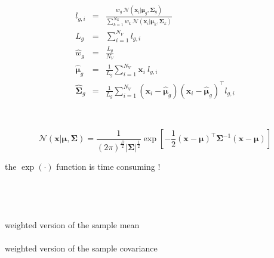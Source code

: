 \documentclass[usenames,dvipsnames]{beamer}
\def\Vec#1{{\boldsymbol{#1}}}
\def\Mat#1{{\boldsymbol{#1}}}
\begin{document}
\begin{frame}
\begin{enumerate}[{~~$\boldsymbol{\bullet}$}]
\begin{minipage}{1\textwidth}
\begin{minipage}{0.45\textwidth}
\centering
%
\begin{eqnarray*}
  l_{g,i}                  & = & \frac{w_g ~ {{\mathcal{N}}}( \Vec{x}_i | \Vec{\mu}_g, \Mat{\Sigma}_g )}{\sum\nolimits_{k=1}^{N_G} w_k ~ {{\mathcal{N}}}( \Vec{x}_i | \Vec{\mu}_k, \Mat{\Sigma}_k )} \\
  L_g                      & = & \sum\nolimits_{i=1}^{N_V} l_{g,i} \\
  \widehat{w}_g            & = & \frac{L_g}{N_V} \\
  \widehat{\Vec{\mu}}_g    & = & \frac{1}{L_g} \sum\nolimits_{i=1}^{N_V} \Vec{x}_i ~ l_{g,i}  \label{eqn:em_mean}  \\
  \widehat{\Mat{\Sigma}}_g & = & \frac{1}{L_g} \sum\nolimits_{i=1}^{N_V} (\Vec{x}_i - \widehat{\Vec{\mu}}_g)(\Vec{x}_i - \widehat{\Vec{\mu}}_g)^\top l_{g,i}
\end{eqnarray*}
\end{minipage}
~
\begin{minipage}{0.45\textwidth}
\begin{tiny}%
\begin{equation*}
  {{\mathcal{N}}}( \Vec{x} | \Vec{\mu}, \Mat{\Sigma} )  = 
  \frac{1}{ (2\pi)^{\frac{D}{2}} | \Mat{\Sigma}|^{\frac{1}{2}} }
  \exp \left[ -\frac{1}{2} (\Vec{x}-\Vec{\mu})^\top \Mat{\Sigma}^{-1} (\Vec{x}-\Vec{\mu}) \right]
\end{equation*}%
\end{tiny}%
the $\exp(\cdot)$ function is time consuming !\\
~\\
~\\
~\\
~\\
weighted version of the sample mean\\
~\\
weighted version of the sample covariance\\
~\\
\end{minipage}

\end{minipage}




\end{enumerate}
\end{frame}
\end{document}
